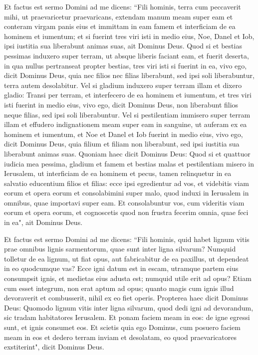 \begin{biblechapter}
\verse Et factus est sermo Domini ad me dicens: 
\verse “Fili hominis, terra cum peccaverit mihi, ut praevaricetur praevaricans, extendam manum meam super eam et conteram virgam panis eius et immittam in eam famem et interficiam de ea hominem et iumentum; 
\verse et si fuerint tres viri isti in medio eius, Noe, Danel et Iob, ipsi iustitia sua liberabunt animas suas, ait Dominus Deus. 
\verse Quod si et bestias pessimas induxero super terram, ut absque liberis faciant eam, et fuerit deserta, in qua nullus pertranseat propter bestias, 
\verse tres viri isti si fuerint in ea, vivo ego, dicit Dominus Deus, quia nec filios nec filias liberabunt, sed ipsi soli liberabuntur, terra autem desolabitur. 
\verse Vel si gladium induxero super terram illam et dixero gladio: Transi per terram, et interfecero de ea hominem et iumentum, 
\verse et tres viri isti fuerint in medio eius, vivo ego, dicit Dominus Deus, non liberabunt filios neque filias, sed ipsi soli liberabuntur. 
\verse Vel si pestilentiam immisero super terram illam et effudero indignationem meam super eam in sanguine, ut auferam ex ea hominem et iumentum, 
\verse et Noe et Danel et Iob fuerint in medio eius, vivo ego, dicit Dominus Deus, quia filium et filiam non liberabunt, sed ipsi iustitia sua liberabunt animas suas. 
\verse Quoniam haec dicit Dominus Deus: Quod si et quattuor iudicia mea pessima, gladium et famem et bestias malas et pestilentiam misero in Ierusalem, ut interficiam de ea hominem et pecus, 
\verse tamen relinquetur in ea salvatio educentium filios et filias: ecce ipsi egredientur ad vos, et videbitis viam eorum et opera eorum et consolabimini super malo, quod induxi in Ierusalem in omnibus, quae importavi super eam. 
\verse Et consolabuntur vos, cum videritis viam eorum et opera eorum, et cognoscetis quod non frustra fecerim omnia, quae feci in ea", ait Dominus Deus. 
\end{biblechapter}

\begin{biblechapter}  
\verse Et factus est sermo Domini ad me dicens: 
\verse “Fili hominis, quid habet lignum vitis prae omnibus lignis sarmentorum, quae sunt inter ligna silvarum? 
\verse Numquid tolletur de ea lignum, ut fiat opus, aut fabricabitur de ea paxillus, ut dependeat in eo quodcumque vas? 
\verse Ecce igni datum est in escam, utramque partem eius consumpsit ignis, et medietas eius adusta est; numquid utile erit ad opus? 
\verse Etiam cum esset integrum, non erat aptum ad opus; quanto magis cum ignis illud devoraverit et combusserit, nihil ex eo fiet operis. 
\verse Propterea haec dicit Dominus Deus: Quomodo lignum vitis inter ligna silvarum, quod dedi igni ad devorandum, sic tradam habitatores Ierusalem. 
\verse Et ponam faciem meam in eos: de igne egressi sunt, et ignis consumet eos. Et scietis quia ego Dominus, cum posuero faciem meam in eos 
\verse et dedero terram inviam et desolatam, eo quod praevaricatores exstiterint", dicit Dominus Deus. 
\end{biblechapter}

